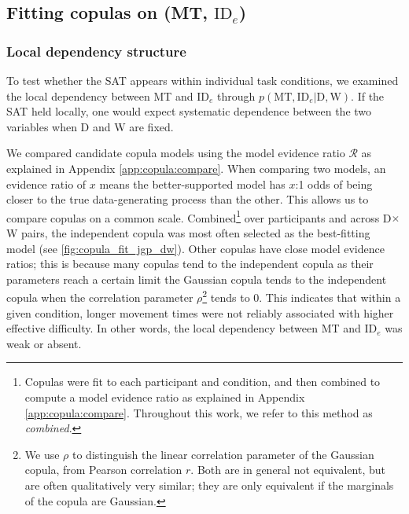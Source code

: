 \documentclass[acmlarge, manuscript,review]{acmart}
\newcommand{\mt}{\ensuremath{{\text{MT}}}\xspace}
\newcommand{\ide}{\ensuremath{{\text{ID}_e}}\xspace}
\newcommand{\D}{\ensuremath{{\text{D}}}\xspace}
\newcommand{\W}{\ensuremath{{\text{W}}}\xspace}
\begin{document}

\subsection{Fitting copulas on (MT, \ide) \label{sub:jgp::fit_copula}}

\subsubsection{Local dependency structure}
To test whether the SAT appears within individual task conditions, we examined the local dependency between MT and \ide through $p(\mt, \ide | \D, \W)$. If the SAT held locally, one would expect systematic dependence between the two variables when D and W are fixed.

We compared candidate copula models using the model evidence ratio $\mathcal{R}$ as explained in Appendix \ref{app:copula:compare}.
When comparing two models, an evidence ratio of $x$ means the better-supported model has $x$:1 odds of being closer to the true data-generating process than the other. This allows us to compare copulas on a common scale.
Combined\footnote{Copulas were fit to each participant and condition, and then combined to compute a model evidence ratio as explained in Appendix \ref{app:copula:compare}. Throughout this work, we refer to this method as \textit{combined}.} over participants and across D$\times$W pairs, the independent copula was most often selected as the best-fitting model (see %
\autoref{fig:copula_fit_jgp_dw}).
Other copulas have close model evidence ratios; this is because many copulas tend to the independent copula as their parameters reach a certain limit \eg the Gaussian copula tends to the independent copula when the correlation parameter $\rho$\footnote{We use $\rho$ to distinguish the linear correlation parameter of the Gaussian copula, from Pearson correlation $r$. Both are in general not equivalent, but are often qualitatively very similar; they are only equivalent if the marginals of the copula are Gaussian.} tends to 0.
This indicates that within a given condition, longer movement times were not reliably associated with higher effective difficulty. In other words, the local dependency between MT and \ide was weak or absent.
\end{document}
